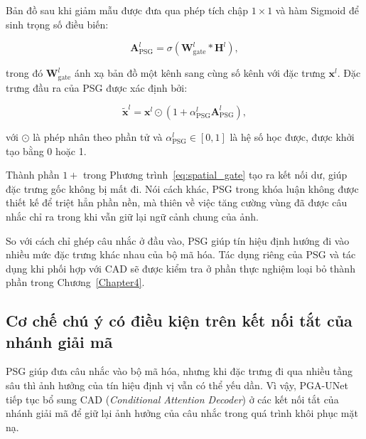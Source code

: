 Bản đồ sau khi giảm mẫu được đưa qua phép tích chập $1\times1$ và hàm Sigmoid để sinh trọng số điều biến:

\begin{equation}
    \mathbf{A}^{l}_{\mathrm{PSG}}
    =
    \sigma
    \left(
        \mathbf{W}^{l}_{\mathrm{gate}}
        \ast
        \mathbf{H}^{l}
    \right),
    \label{eq:psg_attention}
\end{equation}

trong đó $\mathbf{W}^{l}_{\mathrm{gate}}$ ánh xạ bản đồ một kênh sang cùng số kênh với đặc trưng $\mathbf{x}^{l}$. Đặc trưng đầu ra của PSG được xác định bởi:

\begin{equation}
    \widetilde{\mathbf{x}}^{l}
    =
    \mathbf{x}^{l}
    \odot
    \left(
        1+
        \alpha^{l}_{\mathrm{PSG}}
        \mathbf{A}^{l}_{\mathrm{PSG}}
    \right),
    \label{eq:spatial_gate}
\end{equation}

với $\odot$ là phép nhân theo phần tử và
$\alpha^{l}_{\mathrm{PSG}}\in[0,1]$ là hệ số học được, được khởi tạo bằng 0 hoặc 1.

Thành phần $1+$ trong Phương trình~\eqref{eq:spatial_gate} tạo ra kết nối dư, giúp đặc trưng gốc không bị mất đi. Nói cách khác, PSG trong khóa luận không được thiết kế để triệt hẳn phần nền, mà thiên về việc tăng cường vùng đã được câu nhắc chỉ ra trong khi vẫn giữ lại ngữ cảnh chung của ảnh.

So với cách chỉ ghép câu nhắc ở đầu vào, PSG giúp tín hiệu định hướng đi vào nhiều mức đặc trưng khác nhau của bộ mã hóa. Tác dụng riêng của PSG và tác dụng khi phối hợp với CAD sẽ được kiểm tra ở phần thực nghiệm loại bỏ thành phần trong Chương~\ref{Chapter4}.

\subsection{Cơ chế chú ý có điều kiện trên kết nối tắt của nhánh giải mã}
\label{subsec:cad}

PSG giúp đưa câu nhắc vào bộ mã hóa, nhưng khi đặc trưng đi qua nhiều tầng sâu thì ảnh hưởng của tín hiệu định vị vẫn có thể yếu dần. Vì vậy, PGA-UNet tiếp tục bổ sung CAD (\textit{Conditional Attention Decoder}) ở các kết nối tắt của nhánh giải mã để giữ lại ảnh hưởng của câu nhắc trong quá trình khôi phục mặt nạ.

